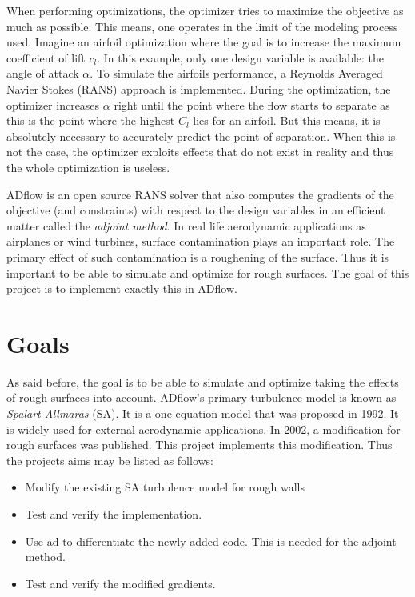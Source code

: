 When performing optimizations, the optimizer tries to maximize the objective as
much as possible. This means, one operates in the limit of the modeling process
used. Imagine an airfoil optimization where the goal is to increase the maximum
coefficient of lift $c_{l}$. In this example, only one design variable is
available: the angle of attack $\alpha$. To simulate the airfoils performance, a
Reynolds Averaged Navier Stokes (RANS) approach is implemented. During the
optimization, the optimizer increases $\alpha$ right until the point where the
flow starts to separate as this is the point where the highest $C_{l}$ lies for
an airfoil. But this means, it is absolutely necessary to accurately predict the
point of separation. When this is not the case, the optimizer exploits effects
that do not exist in reality and thus the whole optimization is useless.

ADflow is an open source RANS solver that also computes the gradients of the
objective (and constraints) with respect to the design variables in an efficient
matter called the \textit{adjoint method}. In real life aerodynamic applications
as airplanes or wind turbines, surface contamination plays an important role.
The primary effect of such contamination is a roughening of the surface. Thus it
is important to be able to simulate and optimize for rough surfaces. The goal of
this project is to implement exactly this in ADflow.


\section{Goals}
As said before, the goal is to be able to simulate and optimize taking the
effects of rough surfaces into account. ADflow's primary turbulence model is
known as \textit{Spalart Allmaras} (SA). It is a one-equation model that was
proposed in 1992. It is widely used for external aerodynamic applications. In
2002, a modification for rough surfaces was published. This project implements
this modification. Thus the projects aims may be listed as follows:

\begin{itemize}
  \item Modify the existing SA turbulence model for rough walls
  \item Test and verify the implementation.
  \item Use \gls{ad} to differentiate the newly added code. This is needed for
the adjoint method.
  \item Test and verify the modified gradients.
\end{itemize}


